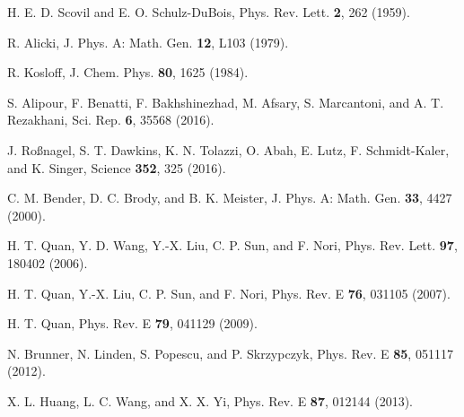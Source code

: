 \documentclass[aps,pra,floatfix,twocolumn,groupedaddress,superscriptaddress,nofootinbib,notitlepage,amsmath,amssymb,]{revtex4-1}
\begin{document}
\begin{thebibliography}{100}

 H. E. D. Scovil and E. O. Schulz-DuBois, Phys. Rev. Lett. \textbf{2}, 262 (1959).

 R. Alicki, J. Phys. A: Math. Gen. \textbf{12}, L103 (1979).

 R. Kosloff, J. Chem. Phys. \textbf{80}, 1625 (1984).

 S. Alipour, F. Benatti, F. Bakhshinezhad, M. Afsary, S. Marcantoni, and A. T. Rezakhani, Sci. Rep. \textbf{6}, 35568 (2016).


 J. Ro{\ss}nagel, S. T. Dawkins, K. N. Tolazzi, O. Abah, E. Lutz, F. Schmidt-Kaler, and K. Singer, Science \textbf{352}, 325 (2016).

 C. M. Bender, D. C. Brody, and B. K. Meister, J. Phys. A: Math. Gen. \textbf{33}, 4427 (2000).

 H. T. Quan, Y. D. Wang, Y.-X. Liu, C. P. Sun, and F. Nori, Phys. Rev. Lett. \textbf{97}, 180402 (2006).

 H. T. Quan, Y.-X. Liu, C. P. Sun, and F. Nori, Phys. Rev. E \textbf{76}, 031105 (2007).

 H. T. Quan, Phys. Rev. E \textbf{79}, 041129 (2009).

 N. Brunner, N. Linden, S. Popescu, and P. Skrzypczyk, Phys. Rev. E \textbf{85}, 051117 (2012).

 X. L. Huang, L. C. Wang, and X. X. Yi, Phys. Rev. E \textbf{87}, 012144 (2013).


\end{thebibliography}
\end{document}

